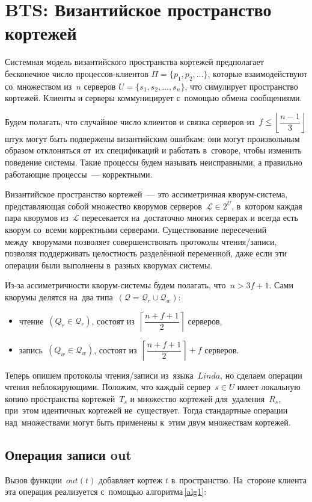 \section{BTS: Византийское пространство кортежей}\label{sec:5}
Системная модель византийского пространства кортежей предполагает бесконечное число процессов-клиентов $\Pi = \{p_1, p_2, \dots\}$, которые взаимодействуют со~множеством из~$n$ серверов $U = \{s_1, s_2, \dots, s_n\}$, что симулирует пространство кортежей. Клиенты и серверы коммуницирует с~помощью обмена сообщениями.

Будем полагать, что случайное число клиентов и связка серверов из~$f \leqslant \left\lfloor \dfrac{n-1}{3} \right\rfloor$ штук могут быть подвержены византийским ошибкам: они могут произвольным образом отклоняться от~их спецификаций и работать в~сговоре, чтобы изменить поведение системы. Такие процессы будем называть неисправными, а правильно работающие процессы~--- корректными.

Византийское пространство кортежей~--- это ассиметричная кворум-система, представляющая собой множество кворумов серверов~$\mathcal{L} \in 2^{U}$, в~котором каждая пара кворумов из~$\mathcal{L}$ пересекается на~достаточно многих серверах и всегда есть кворум со~всеми корректными серверами. Существование пересечений между~кворумами позволяет совершенствовать протоколы чтения/записи, позволяя поддерживать целостность разделённой переменной, даже если эти операции были выполнены в~разных кворумах системы.

Из-за ассиметричности кворум-системы будем полагать, что~$n > 3f + 1$. Сами кворумы делятся на~два типа~$(\mathcal{Q} = \mathcal{Q}_r \cup \mathcal{Q}_w)$:
\begin{itemize}
	\item чтение~$(Q_r \in \mathcal{Q}_r)$, состоят из~$\left\lceil \dfrac{n+f+1}{2} \right\rceil$ серверов,
	\item запись~$(Q_w \in \mathcal{Q}_w)$, состоят из~$\left\lceil \dfrac{n+f+1}{2} \right\rceil + f$ серверов.
\end{itemize}

Теперь опишем протоколы чтения/записи из~языка~$Linda$, но сделаем операции чтения неблокирующими. Положим, что каждый сервер~$s \in U$ имеет локальную копию пространства кортежей~$T_s$ и множество кортежей для~удаления~$R_s$, при~этом идентичных кортежей не~существует. Тогда стандартные операции над~множествами могут быть применены к~этим двум множествам кортежей.

\subsection{Операция записи out}\label{subsec5:1}
Вызов функции~$out(t)$ добавляет кортеж $t$ в~пространство. На~стороне клиента эта операция реализуется с~помощью алгоритма\,\ref{alg1}:

